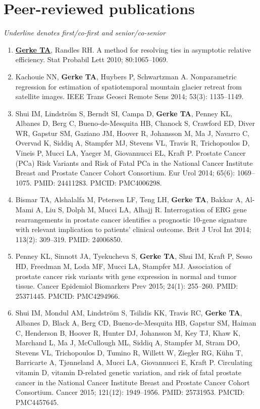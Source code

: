 \documentclass[11pt, a4paper]{article} %
\begin{document}
\section*{Peer-reviewed publications}
\vspace{-.3cm}
{\footnotesize\emph{Underline denotes first/co-first and senior/co-senior}}
\begin{enumerate}[leftmargin=*]
\item{} \underline{{\bf Gerke TA}}, Randles RH. A method for resolving ties in asymptotic relative efficiency.
Stat Probabil Lett 2010; 80:1065--1069.

\item{} Kachouie NN, {\bf Gerke TA}, Huybers P, Schwartzman A. Nonparametric regression for estimation of spatiotemporal mountain glacier retreat from satellite images. IEEE Trans Geosci Remote Sens 2014; 53(3): 1135--1149.

\item{} Shui IM, Lindstr\"{o}m S, Berndt SI, Campa D, {\bf Gerke TA}, Penney KL, Albanes D, Berg C, Bueno-de-Mesquita HB, Chanock S, Crawford ED, Diver WR, Gapstur SM, Gaziano JM, Hoover R, Johansson M, Ma J, Navarro C, Overvad K, Siddiq A, Stampfer MJ, Stevens VL, Travis R, Trichopoulos D, Vineis P, Mucci LA, Yaeger M, Giovannucci EL, Kraft P. Prostate Cancer (PCa) Risk Variants and Risk of Fatal PCa in the National Cancer Institute Breast and Prostate Cancer Cohort Consortium. Eur Urol 2014; 65(6): 1069--1075. PMID: 24411283. PMCID: PMC4006298.

\item{} Bismar TA, Alshalalfa M, Petersen LF, Teng LH, {\bf Gerke TA}, Bakkar A, Al-Mami A, Liu S, Dolph M, Mucci LA, Alhajj R. Interrogation of ERG gene rearrangements in prostate cancer identifies a prognostic 10-gene signature with relevant implication to patients' clinical outcome. Brit J Urol Int 2014; 113(2): 309--319. PMID: 24006850.

\item{} Penney KL, Sinnott JA, Tyekucheva S, {\bf Gerke TA}, Shui IM, Kraft P, Sesso HD, Freedman M, Loda MF, Mucci LA, Stampfer MJ. Association of prostate cancer risk variants with gene expression in normal and tumor tissue. Cancer Epidemiol Biomarkers Prev 2015; 24(1): 255--260. PMID: 25371445. PMCID: PMC4294966.

\item{} Shui IM, Mondul AM, Lindstr\"{o}m S, Tsilidis KK, Travis RC, {\bf Gerke TA}, Albanes D, Black A, Berg CD, Bueno-de-Mesquita HB, Gapstur SM, Haiman C, Henderson B, Hoover R, Hunter DJ, Johansson M, Key TJ, Khaw K, Marchand L, Ma J, McCullough ML, Siddiq A, Stampfer M, Stram DO, Stevens VL, Trichopoulos D, Tumino R, Willett W, Ziegler RG, K\"{u}hn T, Barricarte A, Tj\o nneland A, Mucci LA, Giovannucci E, Kraft P. Circulating vitamin D, vitamin D-related genetic variation, and risk of fatal prostate cancer in the National Cancer Institute Breast and Prostate Cancer Cohort Consortium. Cancer 2015; 121(12): 1949--1956. PMID: 25731953. PMCID: PMC4457645.


\end{enumerate}
\end{document}

